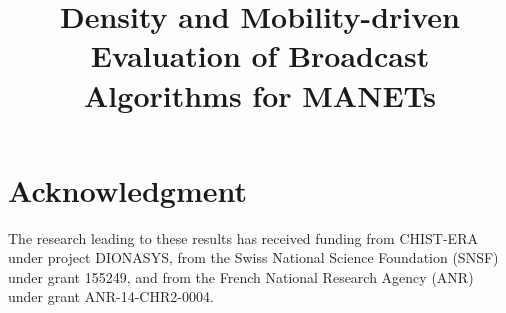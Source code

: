 \documentclass[10pt, conference, letterpaper, final]{IEEEtran}
\begin{document}

\title{Density and Mobility-driven Evaluation of Broadcast Algorithms for MANETs}

 \author{
}
\maketitle





\IEEEpeerreviewmaketitle



\section*{Acknowledgment}
The research leading to these results has received funding from CHIST-ERA under project DIONASYS, from the Swiss National Science Foundation (SNSF) under grant 155249, and from the French National Research Agency (ANR) under grant ANR-14-CHR2-0004.





%
\end{document}
